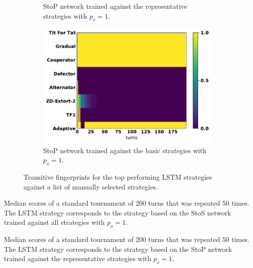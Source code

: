 \begin{figure}[!htbp]
\begin{subfigure}{.32\textwidth}
        \caption{StoP network trained
        against the representative strategies with $p_o=1$.}
    \end{subfigure}\hfill
    \begin{subfigure}{.32\textwidth}
        \includegraphics[width=\textwidth]{src/chapters/07/img/s_t_p_basic_against_seven_opponents.pdf}
        \caption{StoP network trained
        against the basic strategies with $p_o=1$.}
    \end{subfigure}
    \caption{Transitive fingerprints for the top performing LSTM strategies against
    a list of manually selected strategies.}\label{fig:transitive_fingerprints_against_seven}
\end{figure}

\begin{table}[!htbp]
    \begin{center}
    \resizebox{\textwidth}{!}{
        
    }
\end{center}
\caption{Median scores of a standard tournament of 200 turns that was repeated
50 times. The LSTM strategy corresponds to the strategy based on the StoS
network trained against all strategies with
$p_o=1$.}\label{table:scores_s_to_s_against_seven}
\end{table}

\begin{table}[!htbp]
    \begin{center}
    \resizebox{\textwidth}{!}{
        
    }
\end{center}
\caption{Median scores of a standard tournament of 200 turns that was repeated
50 times. The LSTM strategy corresponds to the strategy based on the StoP
network trained against the representative strategies with
$p_o=1$.}\label{table:scores_s_to_p_twenty_against_seven}
\end{table}

